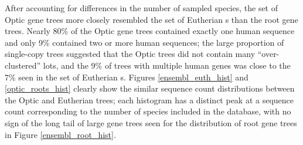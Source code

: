 After accounting for differences in the number of sampled species, the
set of Optic gene trees more closely resembled the set of Eutherian
\subtr{}s than the root \cmp gene trees. Nearly 80\% of the Optic
gene trees contained exactly one human sequence and only 9\% contained
two or more human sequences; the large proportion of single-copy trees
suggested that the Optic trees did not contain many ``over-clustered''
\mammln \acp{lot}, and the 9\% of trees with multiple human genes was
close to the 7\% seen in the set of Eutherian \subtr{}s. Figures
\ref{ensembl_euth_hist} and \ref{optic_roots_hist} clearly show the
similar sequence count distributions between the Optic and Eutherian
trees; each histogram has a distinct peak at a sequence count
corresponding to the number of species included in the database, with
no sign of the long tail of large gene trees seen for the distribution
of root \cmp gene trees in Figure \ref{ensembl_root_hist}.

